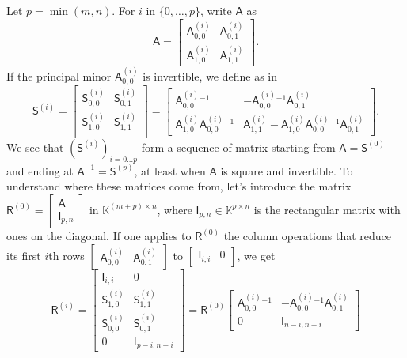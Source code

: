 \documentclass{sig-alternate}
\newcommand{\mA}{\ensuremath{\mathsf{A}}}
\newcommand{\mI}{\ensuremath{\mathsf{I}}}
\newcommand{\mR}{\ensuremath{\mathsf{R}}}
\newcommand{\mS}{\ensuremath{\mathsf{S}}}
\newcommand{\K}{\ensuremath{\mathbb{K}}}
\begin{document}
Let $p=\min(m,n)$. For $i$ in $\{0,\dots,p\}$, write $\mA$ as
$$
\mA=\begin{bmatrix}
    \mA^{(i)}_{0,0} & \mA^{(i)}_{0,1} \\[1mm]
    \mA^{(i)}_{1,0} & \mA^{(i)}_{1,1}
  \end{bmatrix}.
$$ 
If the principal minor
 ${\mA^{(i)}_{0,0}}$  is invertible, we define as in~\cite{Cardinal99}
$$
\mS^{(i)} = 
\begin{bmatrix} 
     \mS^{(i)}_{0,0} & \mS^{(i)}_{0,1}\\
     \mS^{(i)}_{1,0} & \mS^{(i)}_{1,1}\\
\end{bmatrix} = 
\begin{bmatrix} 
   {\mA^{(i)}_{0,0}}{}^{-1} &  -{\mA^{(i)}_{0,0}}{}^{-1} \mA^{(i)}_{0,1} \\[1mm]
    \mA^{(i)}_{1,0} {\mA^{(i)}_{0,0}}{}^{-1} & 
    \mA^{(i)}_{1,1} - \mA^{(i)}_{1,0} {\mA^{(i)}_{0,0}}{}^{-1} \mA^{(i)}_{0,1}
\end{bmatrix}.
$$
We see that $( \mS^{(i)})_{i=0\dots p}$ form a sequence of matrix
starting from $\mA=\mS^{(0)}$ and ending at $\mA^{-1}=\mS^{(p)}$, at
least when $\mA$ is square and invertible. To understand where these
matrices come from, let's introduce the matrix
$ \mR^{(0)} = \begin{bmatrix}
  \mA \\
  \mI_{p, n}
\end{bmatrix} 
$
in $\K^{(m + p) \times n} $, where $\mI_{p, n} \in \K^{p \times n}$ is
the rectangular matrix with ones on the diagonal. If one applies to
$\mR^{(0)}$ the column operations that reduce its first $i$th rows
$\begin{bmatrix} \mA^{(i)}_{0,0} & \mA^{(i)}_{0,1} \end{bmatrix}$ to
$\begin{bmatrix} \mI_{i,i} & 0 \end{bmatrix}$, we get
\begin{equation}\label{eq:Ri}
\mR^{(i)}\!=\!\begin{bmatrix}
     \mI_{i,i} & 0\\
     \mS^{(i)}_{1,0} & \mS^{(i)}_{1,1}\\
     \mS^{(i)}_{0,0} & \mS^{(i)}_{0,1}\\
     0 & \mI_{p - i, n - i}
   \end{bmatrix}\!= \mR^{(0)} \begin{bmatrix}
     \mA_{0, 0}^{(i)} \phantom{}^{- 1} & - \mA_{0, 0}^{(i)} \phantom{}^{- 1} \mA_{0,
     1}^{(i)}\\
     0 & \mI_{n - i,n-i}
   \end{bmatrix}
\end{equation}
\end{document}
